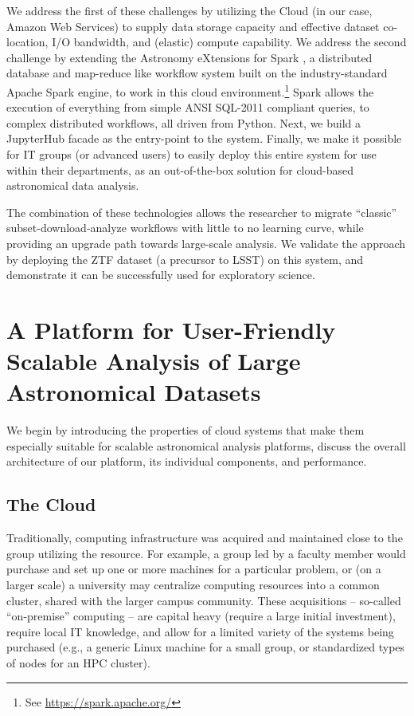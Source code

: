 \documentclass[twocolumn, linenumbers]{aastex631}
\begin{document}
We address the first of these challenges by utilizing the Cloud (in our case, Amazon Web Services) to supply data storage capacity and effective dataset co-location, I/O bandwidth, and (elastic) compute capability. We address the second challenge by extending the Astronomy eXtensions for Spark \citep[AXS;][]{zecevic}, a distributed database and map-reduce like workflow system built on the industry-standard Apache Spark \citep{spark} engine, to work in this cloud environment.\footnote{See \url{https://spark.apache.org/}} Spark allows the execution of everything from simple ANSI SQL-2011 compliant queries, to complex distributed workflows, all driven from Python. Next, we build a JupyterHub facade as the entry-point to the system. Finally, we make it possible for IT groups (or advanced users) to easily deploy this entire system for use within their departments, as an out-of-the-box solution for cloud-based astronomical data analysis.

The combination of these technologies allows the researcher to migrate ``classic'' subset-download-analyze workflows with little to no learning curve, while providing an upgrade path towards large-scale analysis. We validate the approach by deploying the ZTF dataset (a precursor to LSST) on this system, and demonstrate it can be successfully used for exploratory science.

\section{A Platform for User-Friendly Scalable Analysis of Large Astronomical Datasets} \label{sec:platform}

We begin by introducing the properties of cloud systems that make them especially suitable for scalable astronomical analysis platforms, discuss the overall architecture of our platform, its individual components, and performance.

\subsection{The Cloud} \label{sec:cloud}

Traditionally, computing infrastructure was acquired and maintained close to the group utilizing the resource. For example, a group led by a faculty member would purchase and set up one or more machines for a particular problem, or (on a larger scale) a university may centralize computing resources into a common cluster, shared with the larger campus community. These acquisitions -- so-called ``on-premise'' computing -- are capital heavy (require a large initial investment), require local IT knowledge, and allow for a limited variety of the systems being purchased (e.g., a generic Linux machine for a small group, or standardized types of nodes for an HPC cluster).
\end{document}
